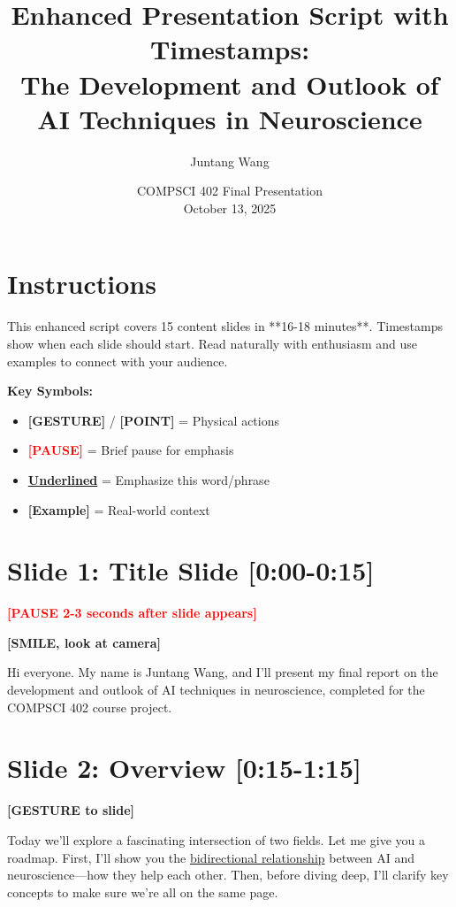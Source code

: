 \documentclass[12pt]{article}
\title{Enhanced Presentation Script with Timestamps:\\The Development and Outlook of AI Techniques in Neuroscience}
\author{Juntang Wang}
\date{COMPSCI 402 Final Presentation\\October 13, 2025}
\begin{document}
\maketitle

\section*{Instructions}
This enhanced script covers 15 content slides in **16-18 minutes**. Timestamps show when each slide should start. Read naturally with enthusiasm and use examples to connect with your audience.

\textbf{Key Symbols:}
\begin{itemize}
  \item \textcolor{DukeBlue}{\textbf{[GESTURE]}} / \textcolor{DukeBlue}{\textbf{[POINT]}} = Physical actions
  \item \textcolor{red}{\textbf{[PAUSE]}} = Brief pause for emphasis
  \item \textbf{\ul{Underlined}} = Emphasize this word/phrase
  \item \textcolor{green!60!black}{\textbf{[Example]}} = Real-world context
\end{itemize}

\hrulefill

\section*{Slide 1: Title Slide [0:00-0:15]}

\textcolor{red}{\textbf{[PAUSE 2-3 seconds after slide appears]}}

\textcolor{DukeBlue}{\textbf{[SMILE, look at camera]}}

Hi everyone. My name is Juntang Wang, and I'll present my final report on the development and outlook of AI techniques in neuroscience, completed for the COMPSCI 402 course project.

\hrulefill

\section*{Slide 2: Overview [0:15-1:15]}

\textcolor{DukeBlue}{\textbf{[GESTURE to slide]}}

Today we'll explore a fascinating intersection of two fields. Let me give you a roadmap. First, I'll show you the \ul{bidirectional relationship} between AI and neuroscience—how they help each other. Then, before diving deep, I'll clarify key concepts to make sure we're all on the same page. 
\end{document}
